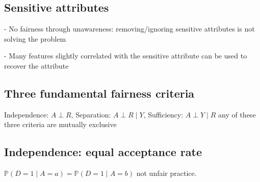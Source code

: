 \subsection*{Sensitive attributes}


- No fairness through unawareness: removing/ignoring sensitive attributes is not solving the problem

- Many features slightly correlated with the sensitive attribute can be used to recover the attribute


\subsection*{Three fundamental fairness criteria}


Independence: $A \perp R$,  Separation: $A \perp R \mid Y$, Sufficiency: $A \perp Y \mid R$ any of these three criteria are mutually exclusive

\subsection*{Independence: equal acceptance rate}


$
\mathbb{P}(D=1 \mid A=a)=\mathbb{P}(D=1 \mid A=b)
$ not unfair practice. 





